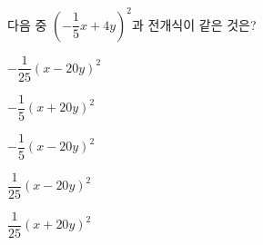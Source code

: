다음 중 $\left(-\dfrac{1}{5}x+4y\right)^2$과 전개식이 같은 것은?
\begin{choicesii}{\rule[-3ex]{0pt}{8ex}$-\dfrac{1}{25}(x-20y)^2$}{\rule[-3ex]{0pt}{8ex}$-\dfrac{1}{5}(x+20y)^2$}{\rule[-3ex]{0pt}{8ex}$-\dfrac{1}{5}(x-20y)^2$}{\rule[-3ex]{0pt}{8ex}$\dfrac{1}{25}(x-20y)^2$}{\rule[-3ex]{0pt}{8ex}$\dfrac{1}{25}(x+20y)^2$}\end{choicesii}
